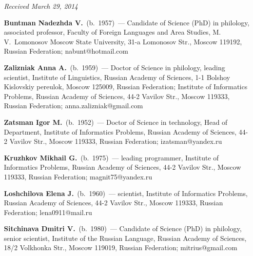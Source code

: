 \vspace*{-9pt}

\hfill{\small\textit{Received March 29, 2014}}

\vspace*{-12pt}

\Contr

\noindent
\textbf{Buntman Nadezhda V.}~(b.~1957)~--- Candidate of Science (PhD)
in philology, associated professor, Faculty of Foreign Languages and Area
Studies, M.\,V.~Lomonosov Moscow State University,
31-a Lomonosov Str., Moscow 119192, Russian Federation;
nabunt@hotmail.com

\pagebreak

\noindent
\textbf{Zalizniak Anna A.}~(b.~1959)~--- Doctor of Science in philology,
leading scientist, Institute of Linguistics, Russian Academy of Sciences,
1-1 Bolshoy Kislovskiy pereulok, Moscow 125009, Russian Federation;
Institute of Informatics Problems, Russian Academy of Sciences,
44-2 Vavilov Str., Moscow 119333, Russian Federation;
anna.zalizniak@gmail.com

\vspace*{3pt}

\noindent
\textbf{Zatsman Igor M.}~(b.~1952)~--- Doctor of Science in technology,
Head of Department, Institute of Informatics Problems, Russian Academy of
Sciences, 44-2 Vavilov Str., Moscow 119333, Russian Federation;
izatsman@yandex.ru

\vspace*{3pt}

\noindent
\textbf{Kruzhkov Mikhail G.}~(b.~1975)~--- leading programmer, Institute
of Informatics Problems, Russian Academy of Sciences,
44-2 Vavilov Str., Moscow 119333, Russian Federation; magnit75@yandex.ru

\vspace*{3pt}

\noindent
\textbf{Loshchilova Elena J.}~(b.~1960)~--- scientist, Institute of
Informatics Problems, Russian Academy of Sciences,
44-2 Vavilov Str., Moscow 119333, Russian Federation;
lena0911@mail.ru

\vspace*{2pt}

\noindent
\textbf{Sitchinava Dmitri V.}~(b.~1980)~--- Candidate of Science (PhD) in
philology, senior scientist, Institute of the Russian Language, Russian
Academy of Sciences, 18/2 Volkhonka Str., Moscow 119019, Russian Federation;
mitrius@gmail.com

 \label{end\stat}

\renewcommand{\bibname}{\protect\rm Литература}